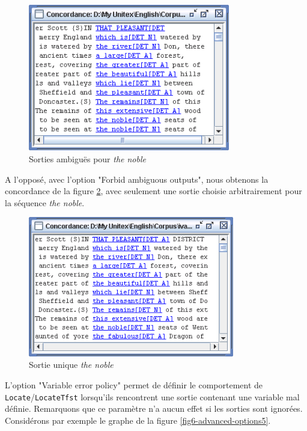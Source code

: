\bigskip
\begin{figure}[!ht]
\begin{center}
\includegraphics[width=8.8cm]{resources/img/fig6-advanced-options3.png}
\caption{Sorties ambiguës pour \textit{the noble}\label{fig6-advanced-options3}}
\end{center}
\end{figure}

\noindent A l'opposé, avec l'option "Forbid ambiguous
outputs", nous obtenons la concordance de la figure \ref{fig6-advanced-options4},
avec seulement une sortie choisie arbitrairement pour la séquence \textit{the noble}.

\bigskip
\begin{figure}[!ht]
\begin{center}
\includegraphics[width=9cm]{resources/img/fig6-advanced-options4.png}
\caption{Sortie unique \textit{the noble}\label{fig6-advanced-options4}}
\end{center}
\end{figure}

\bigskip
\noindent L'option "Variable error policy" permet de définir le comportement de
\verb+Locate+/\verb+LocateTfst+ lorsqu'ils rencontrent une sortie contenant une variable mal
définie. Remarquons que ce paramètre n'a aucun effet si les sorties sont ignorées. 
Considérons par exemple le graphe de la figure
\ref{fig6-advanced-options5}. 

